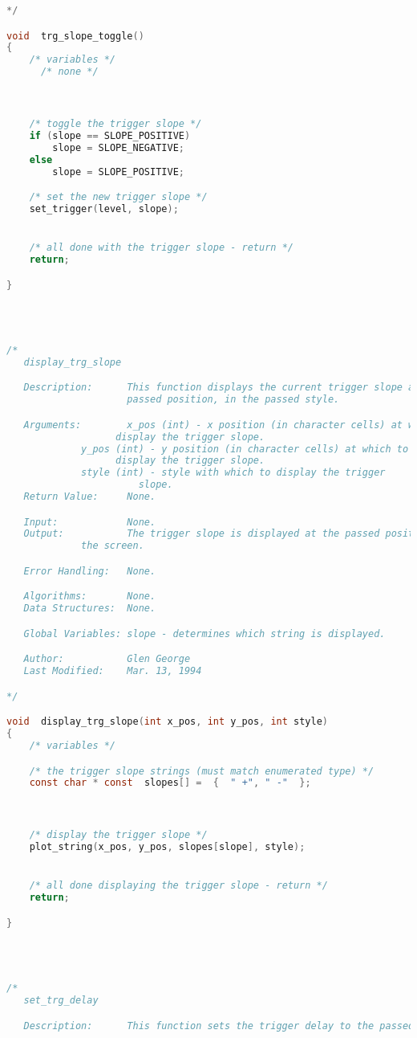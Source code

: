 \begin{lstlisting}[language=C]
*/

void  trg_slope_toggle()
{
    /* variables */
      /* none */



    /* toggle the trigger slope */
    if (slope == SLOPE_POSITIVE)
        slope = SLOPE_NEGATIVE;
    else
        slope = SLOPE_POSITIVE;

    /* set the new trigger slope */
    set_trigger(level, slope);


    /* all done with the trigger slope - return */
    return;

}




/*
   display_trg_slope

   Description:      This function displays the current trigger slope at the
                     passed position, in the passed style.

   Arguments:        x_pos (int) - x position (in character cells) at which to
   				   display the trigger slope.
   		     y_pos (int) - y position (in character cells) at which to
   				   display the trigger slope.
		     style (int) - style with which to display the trigger
		     		   slope.
   Return Value:     None.

   Input:            None.
   Output:           The trigger slope is displayed at the passed position on
   		     the screen.

   Error Handling:   None.

   Algorithms:       None.
   Data Structures:  None.

   Global Variables: slope - determines which string is displayed.

   Author:           Glen George
   Last Modified:    Mar. 13, 1994

*/

void  display_trg_slope(int x_pos, int y_pos, int style)
{
    /* variables */

    /* the trigger slope strings (must match enumerated type) */
    const char * const  slopes[] =  {  " +", " -"  };



    /* display the trigger slope */
    plot_string(x_pos, y_pos, slopes[slope], style);


    /* all done displaying the trigger slope - return */
    return;

}




/*
   set_trg_delay

   Description:      This function sets the trigger delay to the passed value.


\end{lstlisting}
